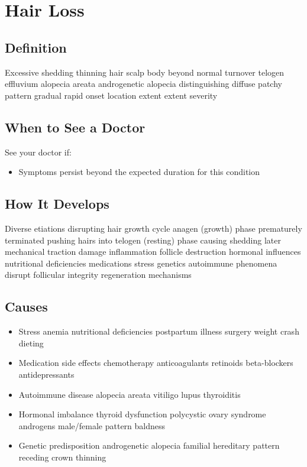 \chapter{Hair Loss}

\section*{Definition}
Excessive shedding thinning hair scalp body beyond normal turnover telogen effluvium alopecia areata androgenetic alopecia distinguishing diffuse patchy pattern gradual rapid onset location extent extent severity

\section*{When to See a Doctor}
See your doctor if:
\begin{itemize}
  \item Symptoms persist beyond the expected duration for this condition
\end{itemize}

\section*{How It Develops}
Diverse etiations disrupting hair growth cycle anagen (growth) phase prematurely terminated pushing hairs into telogen (resting) phase causing shedding later mechanical traction damage inflammation follicle destruction hormonal influences nutritional deficiencies medications stress genetics autoimmune phenomena disrupt follicular integrity regeneration mechanisms

\section*{Causes}
\begin{itemize}
  \item Stress anemia nutritional deficiencies postpartum illness surgery weight crash dieting
  \item Medication side effects chemotherapy anticoagulants retinoids beta-blockers antidepressants
  \item Autoimmune disease alopecia areata vitiligo lupus thyroiditis
  \item Hormonal imbalance thyroid dysfunction polycystic ovary syndrome androgens male/female pattern baldness
  \item Genetic predisposition androgenetic alopecia familial hereditary pattern receding crown thinning
\end{itemize}

